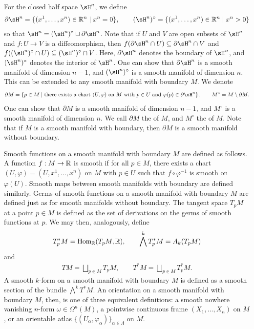 For the closed half space $\sH^{n}$, we define
\begin{align}
    \partial \sH^{n} = \{(x^{1},\ldots,x^{n}) \in \R^{n} \mid x^{n} = 0\}, \qquad (\sH^{n})^{\circ} = \{(x^{1},\ldots,x^{n}) \in \R^{n} \mid x^{n} > 0\}
\end{align}
so that $\sH^{n} = (\sH^{n})^{\circ} \sqcup \partial \sH^{n}$. Note that if $U$ and $V$ are open subsets of $\sH^{n}$ and $f:U \to V$ is a diffeomorphism, then $f(\partial \sH^{n} \cap U) \subseteq \partial \sH^{n} \cap V$ and $f((\sH^{n})^{\circ} \cap U) \subseteq (\sH^{n})^{\circ} \cap V$. Here, $\partial \sH^{n}$ denotes the boundary of $\sH^{n}$, and $(\sH^{n})^{\circ}$ denotes the interior of $\sH^{n}$. One can show that $\partial \sH^{n}$ is a smooth manifold of dimension $n-1$, and $(\sH^{n})^{\circ}$ is a smooth manifold of dimension $n$. This can be extended to any smooth manifold with boundary $M$. We denote
\begin{align}
    \partial M = \{p \in M \mid \text{there exists a chart } (U,\varphi) \text{ on } M \text{ with } p \in U \text{ and } \varphi(p) \in \partial \sH^{n}\}, \qquad M^{\circ} = M \setminus \partial M.
\end{align}
One can show that $\partial M$ is a smooth manifold of dimension $n-1$, and $M^{\circ}$ is a smooth manifold of dimension $n$. We call $\partial M$ the  of $M$, and $M^{\circ}$ the  of $M$. Note that if $M$ is a smooth manifold with boundary, then $\partial M$ is a smooth manifold without boundary.

Smooth functions on a smooth manifold with boundary $M$ are defined as follows. A function $f:M \to \mathbb{R}$ is smooth if for all $p \in M$, there exists a chart $(U,\varphi) = (U,x^{1},\ldots,x^{n})$ on $M$ with $p \in U$ such that $f \circ \varphi^{-1}$ is smooth on $\varphi(U)$. Smooth maps between smooth manifolds with boundary are defined similarly. Germs of smooth functions on a smooth manifold with boundary $M$ are defined just as for smooth manifolds without boundary. The tangent space $T_{p}M$ at a point $p \in M$ is defined as the set of derivations on the germs of smooth functions at $p$. We may then, analogously, define
\begin{align}
    T_{p}^{\ast}M = \operatorname{Hom}_{\mathbb{R}}(T_{p}M,\mathbb{R}), \qquad \bigwedge^{k}T_{p}^{\ast}M = A_{k}(T_{p}M)
\end{align}
and
\begin{align}
    TM = \bigsqcup_{p \in M} T_{p}M, \qquad T^{\ast}M = \bigsqcup_{p \in M} T_{p}^{\ast}M.
\end{align}
A smooth $k$-form on a smooth manifold with boundary $M$ is defined as a smooth section of the bundle $\bigwedge^{k}T^{\ast}M$. An orientation on a smooth manifold with boundary $M$, then, is one of three equivalent definitions: a smooth nowhere vanishing $n$-form $\omega \in \Omega^{n}(M)$, a pointwise continuous frame $(X_{1},\ldots,X_{n})$ on $M$, or an orientable atlas $\{(U_{\alpha},\varphi_{\alpha})\}_{\alpha \in \Lambda}$ on $M$.

